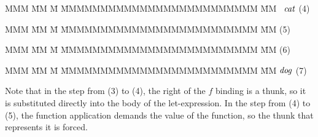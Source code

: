 \vspace{-2em}
\begin{tabbing}
MMM 	\= MM  	  \= M \= MMMMMMMMMMMMMMMMMMMMMMMMM \= MM \kill
\eto	\>  \ $\operatorname{\mathit{cat}}$
	\> \> \> (4)
\end{tabbing}

\vspace{-2em}
\begin{tabbing}
MMM 	\= MM  	  \= M \= MMMMMMMMMMMMMMMMMMMMMMMMM \= MM \kill
\eto	\> 
	\> \> \> (5)
\end{tabbing}

\vspace{-2em}
\begin{tabbing}
MMM 	\= MM  	  \= M \= MMMMMMMMMMMMMMMMMMMMMMMMM \= MM \kill
\eto	\> 
	\> \> \> (6)
\end{tabbing}

\vspace{-2em}
\begin{tabbing}
MMM 	\= MM  	  \= M \= MMMMMMMMMMMMMMMMMMMMMMMMM \= MM \kill
\eto	\> $\operatorname{\mathit{dog}}$
	\> \> \> (7)
\end{tabbing}

Note that in the step from (3) to (4), the right of the $f$ binding is a thunk, so it is substituted directly into the body of the let-expression. In the step from (4) to (5), the function application demands the value of the function, so the thunk that represents it is forced.